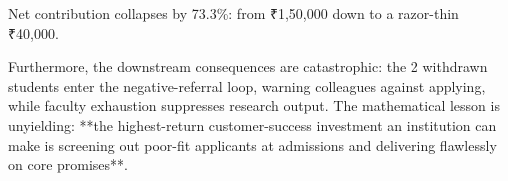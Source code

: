 Net contribution collapses by 73.3\%: from ₹1,50,000 down to a razor-thin ₹40,000. 

Furthermore, the downstream consequences are catastrophic: the 2 withdrawn students enter the negative-referral loop, warning colleagues against applying, while faculty exhaustion suppresses research output. The mathematical lesson is unyielding: **the highest-return customer-success investment an institution can make is screening out poor-fit applicants at admissions and delivering flawlessly on core promises**.

